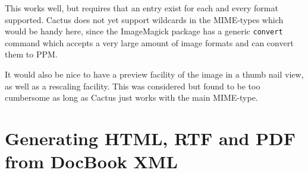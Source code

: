 This works well, but requires that an entry exist for each and every
format supported.  Cactus does not yet support wildcards in the
MIME-types which would be handy here, since the ImageMagick package
has a generic \texttt{convert} command which accepts a very large
amount of image formats and can convert them to PPM.

It would also be nice to have a preview facility of the image in a
thumb nail view, as well as a rescaling facility.  This was considered
but found to be too cumbersome as long as Cactus just works with the
main MIME-type.

\section{Generating HTML, RTF and PDF from DocBook XML}
\label{sec:xml-publishing}







      
